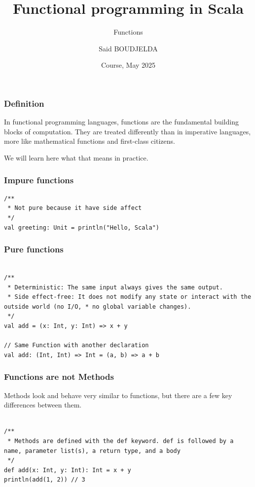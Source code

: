 \documentclass{beamer}
\title[Scala] %
{Functional programming in Scala}
\subtitle{Functions}
\author[Said BOUDJELDA] %
{Said BOUDJELDA}
\institute[efrei] %
{
  Senior Software Engineer @SCIAM\\
  Email : mohamed-said.boudjelda@intervenants.efrei.net \\ 
  Follow me on GitHub @bmscomp
}
\date[efrei 2025] %
{Course, May 2025}
\begin{document}
\frame{\titlepage}


\begin{frame}
\frametitle{Definition}

In functional programming languages, functions are the fundamental building blocks of computation. They are treated differently than in imperative languages, more like mathematical functions and first-class citizens. 

We will learn here what that means in practice.

\end{frame}

\begin{frame}[fragile]
\frametitle{Impure functions}

\begin{lstlisting}[style=scalaStyle]
/**
 * Not pure because it have side affect 
 */
val greeting: Unit = println("Hello, Scala") 

\end{lstlisting}

\end{frame}



\begin{frame}[fragile]
\frametitle{Pure functions}

\begin{lstlisting}[style=scalaStyle]

/**
 * Deterministic: The same input always gives the same output.
 * Side effect-free: It does not modify any state or interact with the outside world (no I/O, * no global variable changes).
 */
val add = (x: Int, y: Int) => x + y

// Same Function with another declaration
val add: (Int, Int) => Int = (a, b) => a + b

\end{lstlisting}

\end{frame}

\begin{frame}[fragile]
\frametitle{Functions are not Methods}

Methods look and behave very similar to functions, but there are a few key differences between them.


\begin{lstlisting}[style=scalaStyle]

/**
 * Methods are defined with the def keyword. def is followed by a name, parameter list(s), a return type, and a body
 */
def add(x: Int, y: Int): Int = x + y
println(add(1, 2)) // 3

\end{lstlisting}

\end{frame}
\end{document}
